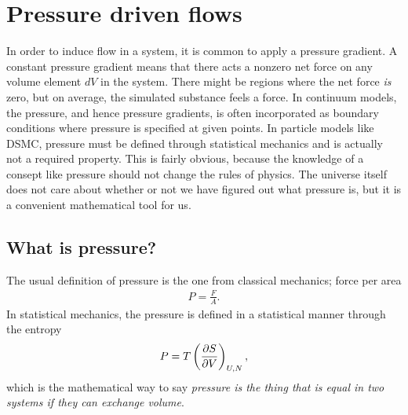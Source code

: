 \section{Pressure driven flows}
In order to induce flow in a system, it is common to apply a pressure gradient. A constant pressure gradient means that there acts a nonzero net force on any volume element $dV$ in the system. There might be regions where the net force \textit{is} zero, but on average, the simulated substance feels a force. In continuum models, the pressure, and hence pressure gradients, is often incorporated as boundary conditions where pressure is specified at given points. In particle models like DSMC, pressure must be defined through statistical mechanics and is actually not a required property. This is fairly obvious, because the knowledge of a consept like pressure should not change the rules of physics. The universe itself does not care about whether or not we have figured out what pressure is, but it is a convenient mathematical tool for us.

\subsection{What is pressure?}
The usual definition of pressure is the one from classical mechanics; force per area
\begin{align}
	P = \frac{F}{A}.
\end{align}
In statistical mechanics, the pressure is defined in a statistical manner through the entropy
\begin{align}
	P = T\left(\frac{\partial S}{\partial V}\right)_{U,N},
\end{align}
which is the mathematical way to say \textit{pressure is the thing that is equal in two systems if they can exchange volume}. 

